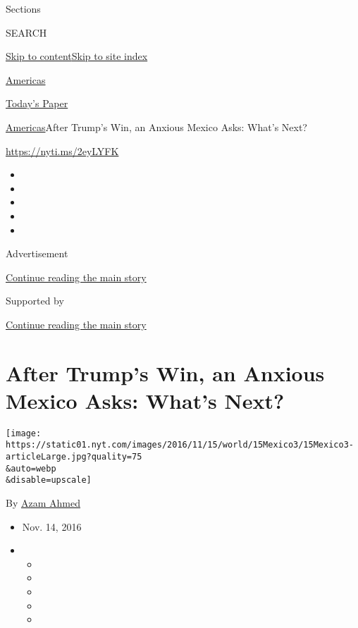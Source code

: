 Sections

SEARCH

\protect\hyperlink{site-content}{Skip to
content}\protect\hyperlink{site-index}{Skip to site index}

\href{https://www.nytimes.com/section/world/americas}{Americas}

\href{https://myaccount.nytimes.com/auth/login?response_type=cookie\&client_id=vi}{}

\href{https://www.nytimes.com/section/todayspaper}{Today's Paper}

\href{/section/world/americas}{Americas}\textbar{}After Trump's Win, an
Anxious Mexico Asks: What's Next?

\url{https://nyti.ms/2eyLYFK}

\begin{itemize}
\item
\item
\item
\item
\item
\end{itemize}

Advertisement

\protect\hyperlink{after-top}{Continue reading the main story}

Supported by

\protect\hyperlink{after-sponsor}{Continue reading the main story}

\hypertarget{after-trumps-win-an-anxious-mexico-asks-whats-next}{%
\section{After Trump's Win, an Anxious Mexico Asks: What's
Next?}\label{after-trumps-win-an-anxious-mexico-asks-whats-next}}

\texttt{[image: https://static01.nyt.com/images/2016/11/15/world/15Mexico3/15Mexico3-articleLarge.jpg?quality=75\\\&auto=webp\\\&disable=upscale]}

By \href{http://www.nytimes.com/by/azam-ahmed}{Azam Ahmed}

\begin{itemize}
\item
  Nov. 14, 2016
\item
  \begin{itemize}
  \item
  \item
  \item
  \item
  \item
  \end{itemize}
\end{itemize}

